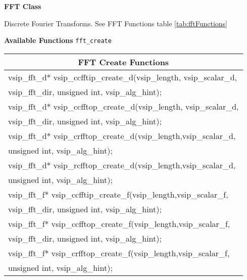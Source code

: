 \clearpage
{\large \textbf{\hypertarget{fftFunc}{FFT Class}}}\vspace{.2cm}\\
\hspace*{.3cm}
\parbox{0.85\textwidth}{Discrete Fourier Transforms. See FFT Functions table \ref{tab:fftFunctions}}
\cvsiplh 
\newline \hspace*{.8cm} \vspace*{.1cm} \textbf{Available Functions }
\newline \hspace*{.8cm} \vspace*{.1cm} \texttt{fft\_create}
\newline \hspace*{1.1cm} {
\ttfamily
\begin{tabular}[H]{l}\hline
\hline \multicolumn{1}{c}{\rmfamily \bfseries FFT Create Functions}\\ \hline
vsip\_fft\_d* vsip\_ccfftip\_create\_d(vsip\_length, vsip\_scalar\_d,\\*\hspace{.7cm}vsip\_fft\_dir, unsigned int, vsip\_alg\_hint);\\
vsip\_fft\_d* vsip\_ccfftop\_create\_d(vsip\_length, vsip\_scalar\_d,\\*\hspace{.7cm}vsip\_fft\_dir, unsigned int, vsip\_alg\_hint);\\
vsip\_fft\_d* vsip\_crfftop\_create\_d(vsip\_length,vsip\_scalar\_d,\\*\hspace{.7cm}unsigned int, vsip\_alg\_hint);\\
vsip\_fft\_d* vsip\_rcfftop\_create\_d(vsip\_length,vsip\_scalar\_d,\\*\hspace{.7cm}unsigned int, vsip\_alg\_hint);\\
vsip\_fft\_f* vsip\_ccfftip\_create\_f(vsip\_length,vsip\_scalar\_f,\\*\hspace{.7cm}vsip\_fft\_dir, unsigned int, vsip\_alg\_hint);\\
vsip\_fft\_f* vsip\_ccfftop\_create\_f(vsip\_length,vsip\_scalar\_f,\\*\hspace{.7cm}vsip\_fft\_dir, unsigned int, vsip\_alg\_hint);\\
vsip\_fft\_f* vsip\_crfftop\_create\_f(vsip\_length,vsip\_scalar\_f,\\*\hspace{.7cm}unsigned int, vsip\_alg\_hint);\\

\end{tabular}}
